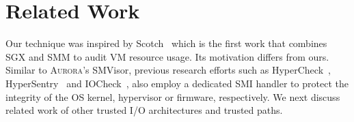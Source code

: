 %


\section{Related Work}
Our technique was inspired by Scotch~\cite{DBLP:conf/raid/LeachZW17} which is the first work that combines SGX and SMM to audit VM resource usage. Its motivation differs from ours.
Similar to \textsc{Aurora}'s SMVisor, previous research efforts such as HyperCheck~\cite{DBLP:conf/raid/WangSG10}, HyperSentry~\cite{DBLP:conf/ccs/AzabNWJZS10} and IOCheck~\cite{DBLP:conf/esorics/ZhangWLS14}, also employ a dedicated SMI handler to protect the integrity of the OS kernel, hypervisor or firmware, respectively.
We next discuss related work of other trusted I/O architectures and trusted paths.

